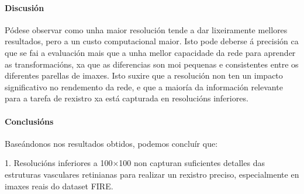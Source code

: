 
\FloatBarrier

\paragraph{Discusión}
\label{par:Discusion-resolution}

Pódese observar como unha maior resolución tende a dar lixeiramente mellores resultados, pero a un custo computacional maior.
Isto pode deberse á precisión ca que se fai a evaluación mais que a unha mellor capacidade da rede para aprender as transformacións, xa que as diferencias son moi pequenas e consistentes entre os diferentes parellas de imaxes.
Isto suxire que a resolución non ten un impacto significativo no rendemento da rede, e que a maioría da información relevante para a tarefa de rexistro xa está capturada en resolucións inferiores.


\paragraph{Conclusións}
\label{par:Conclusions-resolution}

Baseándonos nos resultados obtidos, podemos concluír que:

1. Resolucións inferiores a 100×100 non capturan suficientes detalles das estruturas vasculares retinianas para realizar un rexistro preciso, especialmente en imaxes reais do dataset FIRE.

